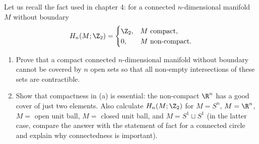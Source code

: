 \documentclass[a4paper,12pt]{report}
\begin{document}
\begin{task}
Let us recall the fact used in chapter \textup{4}\textup{:} for a connected $n$-dimensional manifold $M$ without boundary
\[
H_n(M; \Z_2) = \begin{cases} \Z_2, & M \text{ compact}, \\ 0, & M \text{ non-compact}. \end{cases}
\]
\begin{enumerate}[label=\textup{(\alph*)}]
\item Prove that a compact connected $n$-dimensional manifold without boundary cannot be covered by $n$ open sets so that all non-empty intersections of these sets are contractible. 
\item Show that compactness in \textup{(a)} is essential\textup{:} the non-compact $\R^n$ has a good cover of just two elements. Also calculate $H_n(M; \Z_2)$ for $M = S^n$, $M = \R^n$, $M = $ open unit ball, $M = $ closed unit ball, and $M = S^1 \sqcup S^1$ \textup{(}in the latter case, compare the answer with the statement of fact for a connected circle and explain why connectedness is important\textup{)}.
\end{enumerate}
\end{task}
\end{document}
